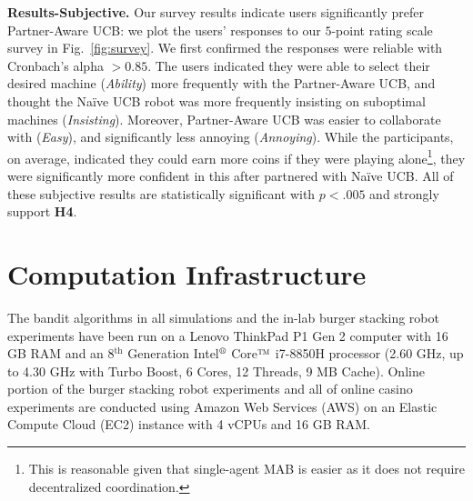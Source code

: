 \documentclass[letterpaper]{article} %
\theoremstyle{definition}
\begin{document}
\noindent\textbf{Results-Subjective.} Our survey results indicate users significantly prefer Partner-Aware UCB: we plot the users' responses to our $5$-point rating scale survey in Fig.~\ref{fig:survey}. We first confirmed the responses were reliable with Cronbach's alpha $ >\!0.85$. The users indicated they were able to select their desired machine (\emph{Ability}) more frequently with the Partner-Aware UCB, and thought the Na\"ive UCB robot was more frequently insisting on suboptimal machines (\emph{Insisting}). Moreover, Partner-Aware UCB was easier to collaborate with (\emph{Easy}), and significantly less annoying (\emph{Annoying}). While the participants, on average, indicated they could earn more coins if they were playing alone\footnote{This is reasonable given that single-agent MAB is easier as it does not require decentralized coordination.}, they were significantly more confident in this after partnered with Na\"ive UCB. All of these subjective results are statistically significant with $p<.005$ and strongly support \textbf{H4}.





\section{Computation Infrastructure}
\label{appendix:infrastructure}
The bandit algorithms in all simulations and the in-lab burger stacking robot experiments have been run on a Lenovo ThinkPad P1 Gen 2 computer with 16 GB RAM and an 8$^\textrm{th}$ Generation Intel$^\text{\textregistered}$ Core$\text{\texttrademark}$ i7-8850H processor (2.60 GHz, up to 4.30 GHz with Turbo Boost, 6 Cores, 12 Threads, 9 MB Cache). Online portion of the burger stacking robot experiments and all of online casino experiments are conducted using Amazon Web Services (AWS) on an Elastic Compute Cloud (EC2) instance with 4 vCPUs and 16 GB RAM.
\end{document}

